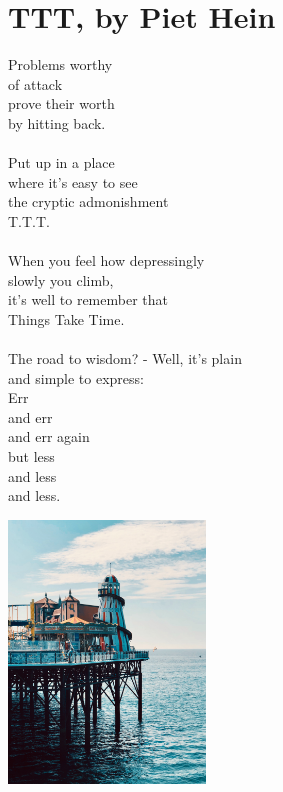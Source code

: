 \section{TTT, by Piet Hein}
Problems worthy \\
of attack \\
prove their worth \\
by hitting back. \\
\\
Put up in a place \\
where it's easy to see \\
the cryptic admonishment\\
    T.T.T. \\
\\
When you feel how depressingly \\
slowly you climb, \\
it's well to remember that\\
Things Take Time. \\
\\
The road to wisdom? - Well, it's plain\\
and simple to express: \\
   Err \\
   and err \\
   and err again \\ 
   but less \\
   and less \\
   and less. \\

\begin{center}
    \includegraphics[width=\linewidth,height=7cm]{src/figures/brighton.jpeg}
\end{center}
